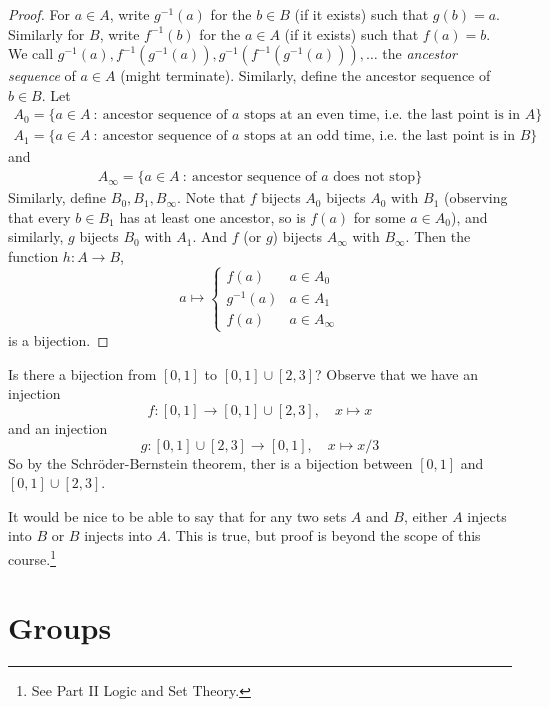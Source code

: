 \documentclass[10pt, a4paper, twoside]{report}
\begin{document}
\begin{proof}
    For \(a\in A\), write \(g^{-1}(a)\) for the \(b\in B\) (if it exists) such that \(g(b)=a\). Similarly for \(B\), write \(f^{-1}(b)\) for the \(a\in A\) (if it exists) such that \(f(a)=b\). We call \(g^{-1}(a),f^{-1}(g^{-1}(a)),g^{-1}(f^{-1}(g^{-1}(a))),\ldots\) the \emph{ancestor sequence} of \(a\in A\) (might terminate). Similarly, define the ancestor sequence of \(b\in B\). Let 
    \begin{align*}
        A_0=\{a\in A\::\:\text{ancestor sequence of \(a\) stops at an even time, i.e. the last point is in \(A\)}\}        
    \end{align*}
    \begin{align*}
        A_1=\{a\in A\::\:\text{ancestor sequence of \(a\) stops at an odd time, i.e. the last point is in \(B\)}\}        
    \end{align*}
    and
    \begin{align*}
        A_\infty=\{a\in A\::\:\text{ancestor sequence of \(a\) does not stop}\}        
    \end{align*}
    Similarly, define \(B_0,B_1,B_\infty\). Note that \(f\) bijects \(A_0\) bijects \(A_0\) with \(B_1\) (observing that every \(b\in B_1\) has at least one ancestor, so is \(f(a)\) for some \(a\in A_0\)), and similarly, \(g\) bijects \(B_0\) with \(A_1\). And \(f\) (or \(g\)) bijects \(A_\infty\) with \(B_\infty\). Then the function \(h:A\to B\),
    \[a\mapsto\begin{cases}
        f(a) & a\in A_0 \\
        g^{-1}(a) & a\in A_1 \\
        f(a) & a\in A_\infty
    \end{cases}\]
is a bijection.
\end{proof}
\begin{example}
    Is there a bijection from \([0,1]\) to \([0,1]\cup[2,3]\)? Observe that we have an injection 
    \[f:[0,1]\to[0,1]\cup[2,3],\quad x\mapsto x\]
    and an injection \[g:[0,1]\cup[2,3]\to[0,1],\quad x\mapsto x/3\]
    So by the Schröder-Bernstein theorem, ther is a bijection between \([0,1]\) and \([0,1]\cup[2,3]\).
\end{example}
It would be nice to be able to say that for any two sets \(A\) and \(B\), either \(A\) injects into \(B\) or \(B\) injects into \(A\). This is true, but proof is beyond the scope of this course.\footnote{See Part II Logic and Set Theory.}
\chapter{Groups}
\end{document}
